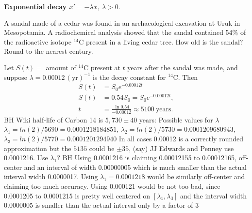 \documentclass[12pt]{book}
\begin{document}
\begin{example}\label{Separaeq:expodecay}
\textbf{Exponential decay $x' = -\lambda x,\ \lambda>0.$}
\vspace{5mm}

A sandal made of a cedar was found in an archaeological excavation at Uruk in Mesopotamia. A radiochemical analysis showed that the sandal contained 54\% of the radioactive isotope ${}^{14}\text{C}$  present in a living cedar tree. How old is the sandal? Round to the nearest century.
\newline

{\color{blue}
Let $S(t) = $ amount of ${}^{14}\text{C}$ present at $t$ years after the sandal
was made, 
and suppose $\lambda=0.00012 \, (\text{yr})^{-1}$ is the decay constant for 
${}^{14}\text{C}$. Then
\begin{align*}
S(t) &= S_0 e^{-0.00012 t}\\
S(t) &= 0.54 S_0 = S_0 e^{-0.00012t},\\
t &= \frac{\ln 0.54}{-0.00012} \approx \text{5100}\ \text{years.}
\end{align*}
}
{\color{teal}BH Wiki half-life of Carbon 14 is $5,730 \pm 40$ years:
Possible values for $\lambda$
$\lambda_1 = ln(2)/5690 = 0.0001218184851$,
$\lambda_2 = ln(2)/5730 = 0.0001209680943$,
$\lambda_3 = ln(2)/5770 = 0.0001201294940$ 
In all cases 0.00012 is a correctly rounded approximation
but the $5135$ could be $\pm 35$, (say)
JJ Edwards and Penney use 0.0001216. Use $\lambda_1?$
BH Using 0.0001216 is claiming 0.00012155 to 0.00012165,
off-center and an interval of width 0.00000005 which is much smaller than the actual interval width 0.0000017.
Using $\lambda_1 = 0.0001218$ would be similarly
off-center and claiming too much accuracy.
Using 0.000121 would be not too bad, since
0.0001205 to 0.0001215 is pretty well centered
on $[\lambda_1,\lambda_3]$
and the interval width 0.0000005 is smaller than
the actual interval only by a factor of 3
}
\end{example}
\end{document}
